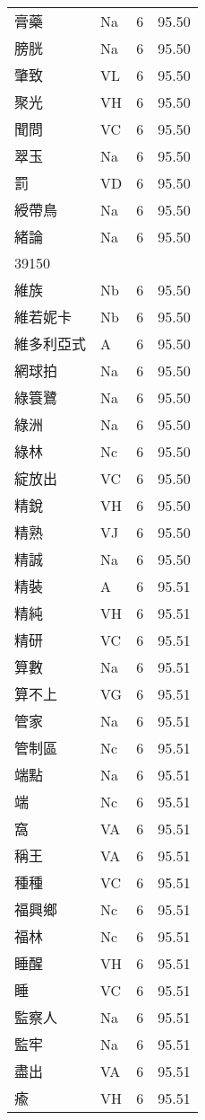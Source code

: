 \documentclass[twocolumn]{book}
\begin{document}
\begin{supertabular}{llrr}
膏藥 & Na & 6 &  95.50\\
膀胱 & Na & 6 &  95.50\\
肇致 & VL & 6 &  95.50\\
聚光 & VH & 6 &  95.50\\
聞問 & VC & 6 &  95.50\\
翠玉 & Na & 6 &  95.50\\
罰 & VD & 6 &  95.50\\
綬帶鳥 & Na & 6 &  95.50\\
緒論 & Na & 6 &  95.50\\
39150\\
維族 & Nb & 6 &  95.50\\
維若妮卡 & Nb & 6 &  95.50\\
維多利亞式 & A & 6 &  95.50\\
網球拍 & Na & 6 &  95.50\\
綠簑鷺 & Na & 6 &  95.50\\
綠洲 & Na & 6 &  95.50\\
綠林 & Nc & 6 &  95.50\\
綻放出 & VC & 6 &  95.50\\
精銳 & VH & 6 &  95.50\\
精熟 & VJ & 6 &  95.50\\
精誠 & Na & 6 &  95.50\\
精裝 & A & 6 &  95.51\\
精純 & VH & 6 &  95.51\\
精研 & VC & 6 &  95.51\\
算數 & Na & 6 &  95.51\\
算不上 & VG & 6 &  95.51\\
管家 & Na & 6 &  95.51\\
管制區 & Nc & 6 &  95.51\\
端點 & Na & 6 &  95.51\\
端 & Nc & 6 &  95.51\\
窩 & VA & 6 &  95.51\\
稱王 & VA & 6 &  95.51\\
種種 & VC & 6 &  95.51\\
福興鄉 & Nc & 6 &  95.51\\
福林 & Nc & 6 &  95.51\\
睡醒 & VH & 6 &  95.51\\
睡 & VC & 6 &  95.51\\
監察人 & Na & 6 &  95.51\\
監牢 & Na & 6 &  95.51\\
盡出 & VA & 6 &  95.51\\
瘉 & VH & 6 &  95.51\\

\end{supertabular}
\end{document}
